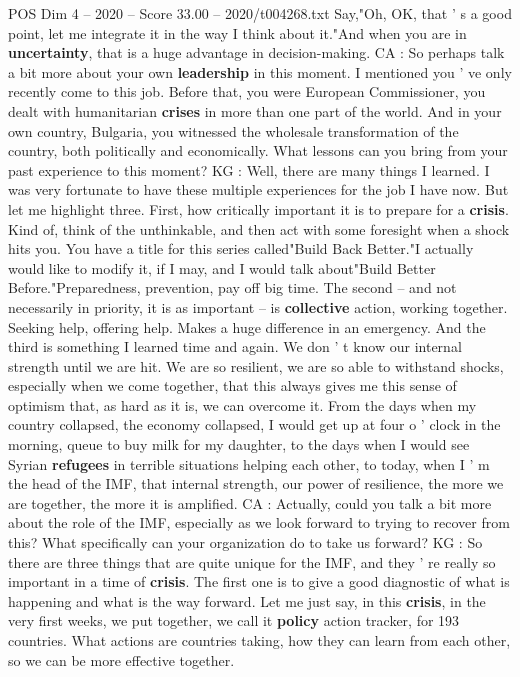 \begin{textsample}{POS Dim 4 – 2020 – Score 33.00 – 2020/t004268.txt}
Say,"Oh, OK, that ' s a good point, let me integrate it in the way I think about it."And when you are in \textbf{uncertainty}, that is a huge advantage in decision-making.
CA : So perhaps talk a bit more about your own \textbf{leadership} in this moment.
I mentioned you ' ve only recently come to this job.
Before that, you were European Commissioner, you dealt with humanitarian \textbf{crises} in more than one part of the world.
And in your own country, Bulgaria, you witnessed the wholesale transformation of the country, both politically and economically.
What lessons can you bring from your past experience to this moment?
KG : Well, there are many things I learned.
I was very fortunate to have these multiple experiences for the job I have now.
But let me highlight three.
First, how critically important it is to prepare for a \textbf{crisis}.
Kind of, think of the unthinkable, and then act with some foresight when a shock hits you.
You have a title for this series called"Build Back Better."I actually would like to modify it, if I may, and I would talk about"Build Better Before."Preparedness, prevention, pay off big time.
The second -- and not necessarily in priority, it is as important -- is \textbf{collective} action, working together.
Seeking help, offering help.
Makes a huge difference in an emergency.
And the third is something I learned time and again.
We don ' t know our internal strength until we are hit.
We are so resilient, we are so able to withstand shocks, especially when we come together, that this always gives me this sense of optimism that, as hard as it is, we can overcome it.
From the days when my country collapsed, the economy collapsed, I would get up at four o ' clock in the morning, queue to buy milk for my daughter, to the days when I would see Syrian \textbf{refugees} in terrible situations helping each other, to today, when I ' m the head of the IMF, that internal strength, our power of resilience, the more we are together, the more it is amplified.
CA : Actually, could you talk a bit more about the role of the IMF, especially as we look forward to trying to recover from this?
What specifically can your organization do to take us forward?
KG : So there are three things that are quite unique for the IMF, and they ' re really so important in a time of \textbf{crisis}.
The first one is to give a good diagnostic of what is happening and what is the way forward.
Let me just say, in this \textbf{crisis}, in the very first weeks, we put together, we call it \textbf{policy} action tracker, for 193 countries.
What actions are countries taking, how they can learn from each other, so we can be more effective together.

\end{textsample}
